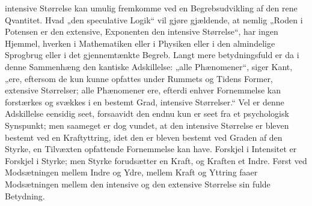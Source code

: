 \documentclass[12pt]{book}
\newcommand{\opage}[1]{\marginnote{\footnotesize\textit{[#1]}}}
\begin{document}
intensive Størrelse kan umulig fremkomme ved en Begrebsudvikling af den rene Qvantitet. Hvad „den
speculative Logik“ vil gjøre gjældende, at nemlig „Roden i Potensen er den extensive, Exponenten den
intensive Størrelse“, har ingen Hjemmel, hverken i Mathematiken eller i Physiken eller i den almindelige
Sprogbrug eller i det gjennemtænkte Begreb. Langt mere betydningsfuld er da i denne Sammenhæng den
kantiske Adskillelse: „alle Phænomener“, siger
\opage{306} Kant, „ere, eftersom de kun kunne opfattes under Rummets og Tidens Former, extensive Størrelser; alle
Phænomener ere, efterdi enhver Fornemmelse kan forstærkes og svækkes i en bestemt Grad, intensive
Størrelser.“ Vel er denne Adskillelse eensidig seet, forsaavidt den endnu kun er seet fra et psychologisk
Synspunkt; men saameget er dog vundet, at den intensive Størrelse er bleven bestemt ved en Kraftyttring,
idet den er bleven bestemt ved Graden af den Styrke, en Tilvæxten opfattende Fornemmelse kan have.
Forskjel i Intensitet er Forskjel i Styrke; men Styrke forudsætter en Kraft, og Kraften et Indre. Først
ved Modsætningen mellem Indre og Ydre, mellem Kraft og Yttring faaer Modsætningen mellem den intensive og
den extensive Størrelse sin fulde Betydning.
\end{document}
